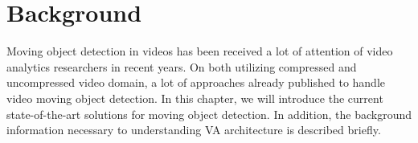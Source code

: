 \chapter{Background}
Moving object detection in videos has been received a lot of attention of video analytics researchers in recent years.
On both utilizing compressed and uncompressed video domain,  a lot of approaches already published to handle video moving object detection. In this chapter, we will introduce the current state-of-the-art solutions for moving object detection. In addition, the background information necessary to understanding VA architecture is described briefly.
